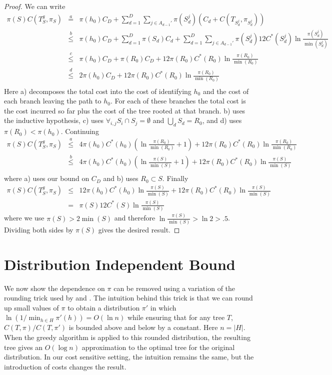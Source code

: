 \documentclass{article}
\begin{document}
\begin{proof}
We can write
\begin{eqnarray*}
\pi(S)C(T^g_S, \pi_S)
& \stackrel{a}{=} & \pi(h_0) C_D + \sum_{d=1}^{D} \sum_{j \in A_{d-1}'}
\pi(S_d^j) (C_d + C(T_{S_d^j}, \pi_{S_d^j})) \\
& \stackrel{b}{\leq} & \pi(h_0) C_D + \sum_{d=1}^{D} \pi(S_d) C_d  
 + \sum_{d=1}^{D} \sum_{j \in A_{d-1}'}
\pi(S_d^j) 12 C^*(S_d^j) \ln \frac{\pi(S_d^j)}{\min(S_d^j)} \\
& \stackrel{c}{\leq} & \pi(h_0) C_D + 
\pi(R_0) C_D + 12 \pi(R_0) C^*(R_0) \ln \frac{\pi(R_0)}{\min(R_0)} \\
& \stackrel{d}{\leq} & 2 \pi(h_0) C_D + 
12 \pi(R_0) C^*(R_0) \ln \frac{\pi(R_0)}{\min(R_0)} \\
\end{eqnarray*}
Here a) decomposes the total cost into the cost of identifying
$h_0$ and the cost of each branch leaving the path to $h_0$.
For each of these branches the total cost is the cost incurred so far
plus the cost of the tree rooted at that branch.
b) uses the inductive hypothesis, c) uses 
$\forall_{i,j} S_i \cap S_j = \emptyset$ and $\bigcup_d S_d = R_0$,
and d) uses $\pi(R_0)<\pi(h_0)$.  Continuing
\begin{eqnarray*}
\pi(S)C(T^g_S, \pi_S)
& \stackrel{a}{\leq} & 4 \pi(h_0) C^*(h_0) 
(\ln \frac{\pi(R_0)}{\min(R_0)} + 1)
+ 12 \pi(R_0) C^*(R_0) \ln \frac{\pi(R_0)}{\min(R_0)} \\
& \stackrel{b}{\leq} &  4 \pi(h_0) C^*(h_0) 
(\ln \frac{\pi(S)}{\min(S)} + 1)
+ 12 \pi(R_0) C^*(R_0) \ln \frac{\pi(S)}{\min(S)} \\
\end{eqnarray*}
where a) uses our bound on $C_D$ and b) uses $R_0 \subset S$.  Finally
\begin{eqnarray*}
\pi(S)C(T^g_S, \pi_S) 
& \leq &  12 \pi(h_0) C^*(h_0) \ln \frac{\pi(S)}{\min(S)} 
 + 12 \pi(R_0) C^*(R_0) \ln \frac{\pi(S)}{\min(S)} \\
& = & \pi(S) 12 C^*(S) \ln \frac{\pi(S)}{\min(S)} 
\end{eqnarray*}
where we use $\pi(S) > 2 \min(S)$ and therefore 
$\ln \frac{\pi(S)}{\min(S)} > \ln 2 > .5$.  Dividing both sides by $\pi(S)$
gives the desired result.
\end{proof}


\section{Distribution Independent Bound}

We now show the dependence on $\pi$ can be removed using a variation
of the rounding trick used by \citet{optimalsplit} and
\citet{decisiontreesentity}.  The intuition behind this trick is that
we can round up small values of $\pi$ to obtain a distribution $\pi'$
in which $\ln (1 / \min_{h \in H} \pi'(h)) = O(\ln n)$ while ensuring
that for any tree $T$, $C(T, \pi)/C(T, \pi')$ is bounded above and
below by a constant.  
Here $n=|H|$.
When the greedy algorithm is applied to this
rounded distribution, the resulting tree gives an $O(\log n)$
approximation to the optimal tree for the original distribution.  In
our cost sensitive setting, the intuition remains the same, but
the introduction of costs changes the result.
\end{document}
